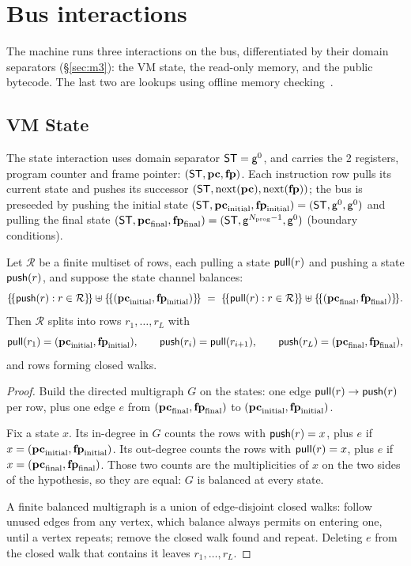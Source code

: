 \section{Bus interactions}\label{sec:omc}

The machine runs three interactions on the bus, differentiated by their domain separators (\S\ref{sec:m3}): the VM state, the read-only memory, and the public bytecode. The last two are lookups using offline memory checking~\cite{BEGKN94}.

\subsection{VM State}\label{sec:state}

The state interaction uses domain separator $\mathsf{ST} = \mathsf{g}^{0}$, and carries the 2 registers, program counter and frame pointer: $( \mathsf{ST},\mathbf{pc},\mathbf{fp} )$. Each instruction row pulls its current state and pushes its successor $( \mathsf{ST},\mathrm{next}(\mathbf{pc}),\mathrm{next}(\mathbf{fp}) )$; the bus is preseeded by pushing the initial state $( \mathsf{ST},\mathbf{pc}_{\mathrm{initial}},\mathbf{fp}_{\mathrm{initial}} ) = ( \mathsf{ST},\mathsf{g}^0,\mathsf{g}^0 )$ and pulling the final state $( \mathsf{ST},\mathbf{pc}_{\mathrm{final}},\mathbf{fp}_{\mathrm{final}} ) = ( \mathsf{ST},\mathsf{g}^{N_{\mathrm{prog}} - 1},\mathsf{g}^0 )$ (boundary conditions).
\begin{proposition}\label{prop:walk}
Let $\mathcal R$ be a finite multiset of rows, each pulling a state $\mathsf{pull}(r)$ and pushing a state $\mathsf{push}(r)$, and suppose the state channel balances:
\[
  \mset{\bpush(r):r\in\mathcal R}\uplus\mset{(\pc_{\mathrm{initial}},\fp_{\mathrm{initial}})}
  \;=\;\mset{\bpull(r):r\in\mathcal R}\uplus\mset{(\pc_{\mathrm{final}},\fp_{\mathrm{final}})} .
\]
Then $\mathcal R$ splits into rows $r_1,\dots,r_L$ with
\[
  \mathsf{pull}(r_1)=(\mathbf{pc}_{\mathrm{initial}},\mathbf{fp}_{\mathrm{initial}}),\qquad \mathsf{push}(r_i)=\mathsf{pull}(r_{i+1}),\qquad \mathsf{push}(r_L)=(\mathbf{pc}_{\mathrm{final}},\mathbf{fp}_{\mathrm{final}}),
\]
and rows forming closed walks.
\end{proposition}

\begin{proof}
Build the directed multigraph $G$ on the states: one edge $\mathsf{pull}(r)\to \mathsf{push}(r)$ per row, plus one edge $e$ from $(\mathbf{pc}_{\mathrm{final}},\mathbf{fp}_{\mathrm{final}})$ to $(\mathbf{pc}_{\mathrm{initial}},\mathbf{fp}_{\mathrm{initial}})$.

Fix a state $x$. Its in-degree in $G$ counts the rows with $\mathsf{push}(r)=x$, plus $e$ if $x=(\mathbf{pc}_{\mathrm{initial}},\mathbf{fp}_{\mathrm{initial}})$. Its out-degree counts the rows with $\mathsf{pull}(r)=x$, plus $e$ if $x=(\mathbf{pc}_{\mathrm{final}},\mathbf{fp}_{\mathrm{final}})$. Those two counts are the multiplicities of $x$ on the two sides of the hypothesis, so they are equal: $G$ is balanced at every state.

A finite balanced multigraph is a union of edge-disjoint closed walks: follow unused edges from any vertex, which balance always permits on entering one, until a vertex repeats; remove the closed walk found and repeat. Deleting $e$ from the closed walk that contains it leaves $r_1,\dots,r_L$.
\end{proof}


